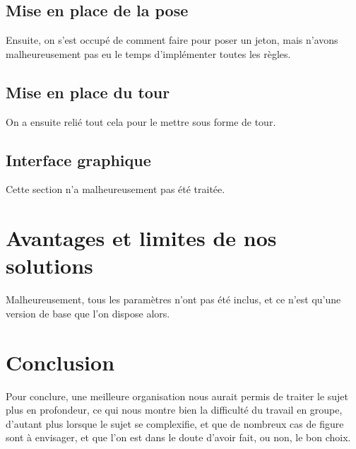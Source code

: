 \subsection{Mise en place de la pose}
Ensuite, on s'est occupé de comment faire pour poser un jeton, mais n'avons malheureusement pas eu le temps d'implémenter toutes les règles.
\subsection{Mise en place du tour}
On a ensuite relié tout cela pour le mettre sous forme de tour.

\subsection{Interface graphique}
Cette section n'a malheureusement pas été traitée.

\newpage
\section{Avantages et limites de nos solutions}
Malheureusement, tous les paramètres n'ont pas été inclus, et ce n'est qu'une version de base que l'on dispose alors.

\newpage
	\section*{Conclusion}
	
	Pour conclure, une meilleure organisation nous aurait permis de traiter le sujet plus en profondeur, ce qui nous montre bien la difficulté du travail en groupe, d'autant plus lorsque le sujet se complexifie, et que de nombreux cas de figure sont à envisager, et que l'on est dans le doute d'avoir fait, ou non, le bon choix.


